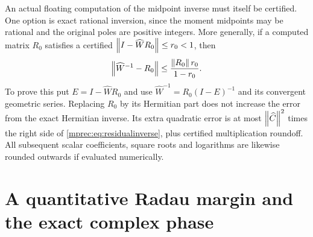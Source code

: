 An actual floating computation of the midpoint inverse must itself
be certified. One option is exact rational inversion, since the
moment midpoints may be rational and the original poles are positive
integers. More generally, if a computed matrix $R_0$ satisfies a
certified $\left\lVert I-\widehat W R_0\right\rVert\le r_0<1$, then
\begin{equation}\label{mprec:eq:residualinverse}
 \left\lVert\widehat W^{-1}-R_0\right\rVert
 \le\frac{\left\lVert R_0\right\rVert r_0}{1-r_0}.
\end{equation}
To prove this put $E=I-\widehat W R_0$ and use
$\widehat W^{-1}=R_0(I-E)^{-1}$ and its convergent geometric
series. Replacing $R_0$ by its Hermitian part does not increase
the error from the exact Hermitian inverse. Its extra quadratic
error is at most $\left\lVert\widehat C\right\rVert^2$ times the right side of
\eqref{mprec:eq:residualinverse}, plus certified multiplication roundoff.
All subsequent scalar coefficients, square roots and logarithms are
likewise rounded outwards if evaluated numerically.

\section{A quantitative Radau margin and the exact complex phase}


